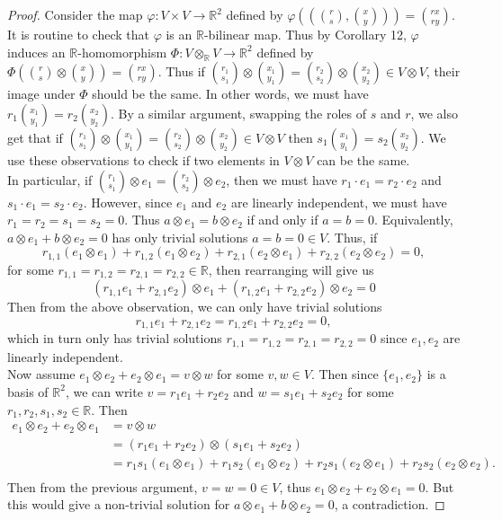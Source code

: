 \documentclass{article}
\begin{document}
  \begin{proof}
    Consider the map $\varphi:V\times V\rightarrow\mathbb{R}^2$ defined by
    $\varphi\left(\left(\binom{r}{s},\binom{x}{y}\right)\right)
    =\binom{rx}{ry}$. It is routine to check that $\varphi$ is an
    $\mathbb{R}$-bilinear map. Thus by Corollary 12, $\varphi$ induces an
    $\mathbb{R}$-homomorphism
    $\Phi:V\otimes_\mathbb{R}V\rightarrow\mathbb{R}^2$ defined by
    $\Phi\left(\binom{r}{s}\otimes\binom{x}{y}\right) =\binom{rx}{ry}$.
    Thus if $\binom{r_1}{s_1}\otimes\binom{x_1}{y_1}
    =\binom{r_2}{s_2}\otimes\binom{x_2}{y_2} \in V\otimes V$, their image
    under $\Phi$ should be the same. In other words, we must have
    $r_1\binom{x_1}{y_1} =r_2\binom{x_2}{y_2}$. By a similar argument,
    swapping the roles of $s$ and $r$, we also get that if
    $\binom{r_1}{s_1}\otimes\binom{x_1}{y_1}
    =\binom{r_2}{s_2}\otimes\binom{x_2}{y_2} \in V\otimes V$ then
    $s_1\binom{x_1}{y_1} =s_2\binom{x_2}{y_2}$. We use these observations
    to check if two elements in $V\otimes V$ can be the same. \\

    In particular, if $\binom{r_1}{s_1}\otimes e_1 =\binom{r_2}{s_2}\otimes
    e_2$, then we must have $r_1\cdot e_1=r_2\cdot e_2$ and $s_1\cdot
    e_1=s_2\cdot e_2$. However, since $e_1$ and $e_2$ are linearly
    independent, we must have $r_1=r_2=s_1=s_2=0$. Thus $a\otimes e_1
    =b\otimes e_2$ if and only if $a=b=0$. Equivalently, $a\otimes e_1
    +b\otimes e_2=0$ has only trivial solutions $a=b=0\in V$. Thus, if
    \[r_{1,1}(e_1\otimes e_1) +r_{1,2}(e_1\otimes e_2) +r_{2,1}(e_2\otimes
      e_1) +r_{2,2}(e_2\otimes e_2)=0,\]
    for some $r_{1,1}=r_{1,2}=r_{2,1}=r_{2,2}\in\mathbb{R}$, then
    rearranging will give us
    \[(r_{1,1}e_1 +r_{2,1}e_2)\otimes e_1 +(r_{1,2}e_1 +r_{2,2}e_2)\otimes
      e_2=0\]
    Then from the above observation, we can only have trivial solutions
    \[r_{1,1}e_1 +r_{2,1}e_2 =r_{1,2}e_1 +r_{2,2}e_2 =0,\]
    which in turn only has trivial solutions
    $r_{1,1}=r_{1,2}=r_{2,1}=r_{2,2}=0$ since $e_1,e_2$ are linearly
    independent. \\

    Now assume $e_1\otimes e_2+e_2\otimes e_1 =v\otimes w$ for some $v,w\in
    V$. Then since $\{e_1,e_2\}$ is a basis of $\mathbb{R}^2$, we can write
    $v=r_1e_1+r_2e_2$ and $w=s_1e_1+s_2e_2$ for some
    $r_1,r_2,s_1,s_2\in\mathbb{R}$. Then
    \begin{align*}
      e_1\otimes e_2+e_2\otimes e_1 &=v\otimes w\\
      &=(r_1e_1+r_2e_2) \otimes(s_1e_1+s_2e_2)\\
      &=r_1s_1(e_1\otimes e_1) +r_1s_2(e_1\otimes e_2) +r_2s_1(e_2\otimes
        e_1) +r_2s_2(e_2\otimes e_2).\\
    \end{align*}
    Then from the previous argument, $v=w=0\in V$, thus $e_1\otimes
    e_2+e_2\otimes e_1=0$. But this would give a non-trivial solution for
    $a\otimes e_1+b\otimes e_2=0$, a contradiction.
  \end{proof}
\end{document}
